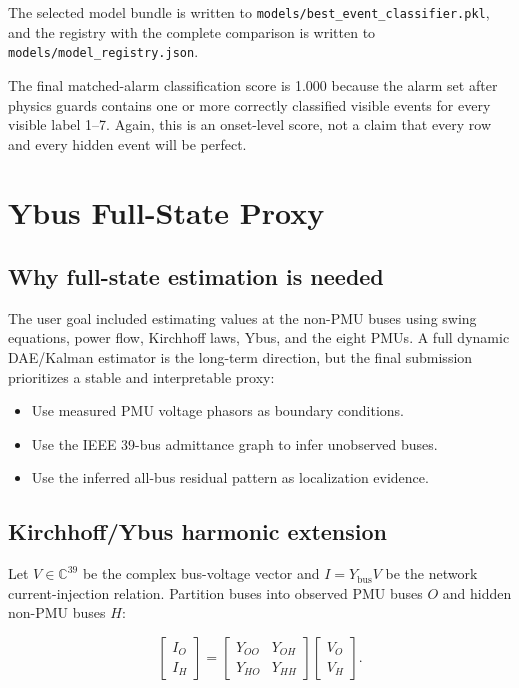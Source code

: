 \documentclass[11pt]{article}
\newcommand{\C}{\mathbb{C}}
\newcommand{\Ybus}{\ensuremath{Y_{\mathrm{bus}}}}
\begin{document}
The selected model bundle is written to
\texttt{models/best\_event\_classifier.pkl}, and the registry with the complete
comparison is written to \texttt{models/model\_registry.json}.

The final matched-alarm classification score is 1.000 because the alarm set
after physics guards contains one or more correctly classified visible events
for every visible label 1--7. Again, this is an onset-level score, not a claim
that every row and every hidden event will be perfect.

\section{Ybus Full-State Proxy}

\subsection{Why full-state estimation is needed}

The user goal included estimating values at the non-PMU buses using swing
equations, power flow, Kirchhoff laws, Ybus, and the eight PMUs. A full
dynamic DAE/Kalman estimator is the long-term direction, but the final submission
prioritizes a stable and interpretable proxy:

\begin{itemize}
  \item Use measured PMU voltage phasors as boundary conditions.
  \item Use the IEEE 39-bus admittance graph to infer unobserved buses.
  \item Use the inferred all-bus residual pattern as localization evidence.
\end{itemize}

\subsection{Kirchhoff/Ybus harmonic extension}

Let $V\in\C^{39}$ be the complex bus-voltage vector and
$I=\Ybus V$ be the network current-injection relation. Partition buses into
observed PMU buses $O$ and hidden non-PMU buses $H$:

\begin{equation}
  \begin{bmatrix}
    I_O \\
    I_H
  \end{bmatrix}
  =
  \begin{bmatrix}
    Y_{OO} & Y_{OH} \\
    Y_{HO} & Y_{HH}
  \end{bmatrix}
  \begin{bmatrix}
    V_O \\
    V_H
  \end{bmatrix}.
\end{equation}
\end{document}
